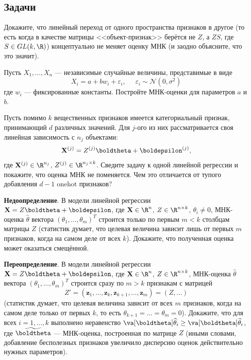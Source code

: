 \subsection*{Задачи}

\begin{problem}
    Докажите, что линейный переход от одного пространства признаков в другое (то есть когда в качестве матрицы <<объект-признак>> берётся не $Z$, а $ZS$, где $S \in GL(k, \R)$) концептуально не меняет оценку МНК (и заодно объясните, что это значит).
\end{problem}

\begin{problem}
	Пусть $X_1, \ldots, X_n$ --- независимые случайные величины, представимые в виде
\[
X_i = a + bw_i + \varepsilon_i, \;\;\;\;\; \varepsilon_i \sim \mathcal{N}(0, \sigma^2)
\]
где $w_i$ --- фиксированные константы. Постройте МНК-оценки для параметров $a$ и $b$.
\end{problem}

\begin{problem}
    Пусть помимо $k$ вещественных признаков имеется категориальный признак, принимающий $d$ различных значений. Для $j$-ого из них рассматривается своя линейная зависимость с $n_j$ объектами:
    \[
    \mathbf X^{(j)} = Z^{(j)} \boldtheta + \boldepsilon^{(j)},
    \]
    где $\mathbf X^{(j)} \in \R^{n_j}$, $Z^{(j)} \in \R^{n_j \times k}$. Сведите задачу к одной линейной регрессии и покажите, что оценка МНК не поменяется. Чем это отличается от тупого добавления $d-1$ onehot признаков?
\end{problem}

\begin{problem}
	{\bf Недоопределение}. В модели линейной регрессии $\mathbf{X} = Z\boldtheta + \boldepsilon$, где $\mathbf{X} \in \R^n$, $Z\in \R^{n \times k}$, $\theta_i \ne 0$, МНК-оценка $\widehat{\theta}$ вектора $(\theta_1, \ldots, \theta_m)^T$ строится только по первым $m < k$ столбцам матрицы $Z$ (статистик думает, что целевая величина зависит лишь от первых $m$ признаков, когда на самом деле от всех $k$). Докажите, что полученная оценка может оказаться смещённой.
\end{problem}

\begin{problem}
	{\bf Переопределение}. В модели линейной регрессии $\mathbf{X} = Z\boldtheta + \boldepsilon$, где $\mathbf{X} \in \R^n$, $Z\in \R^{n \times k}$, МНК-оценка $\widehat{\theta}$ вектора $(\theta_1, \ldots, \theta_m)^T$ строится сразу по $m > k$ признакам с матрицей
$$
Z' = (\mathbf{z}_{1}, \ldots, \mathbf{z}_{k}, \mathbf{z}_{k+1}, \ldots, \mathbf{z}_{m}) = (Z, \ldots)
$$
(статистик думает, что целевая величина зависит от всех $m$ признаков, когда на самом деле только от первых $k$, то есть $\theta_{k+1} = \ldots = \theta_m = 0$). Докажите, что для всех $i = 1, \ldots, k$ выполнено неравенство $\va[\boldtheta] \widehat\theta_i \ge \va[\boldtheta] \widetilde\theta_i$, где $\widetilde\boldtheta$ --- МНК-оценка, построенная по матрице $Z$ (иными словами, добавление бесполезных признаков увеличило дисперсию оценок действительно нужных параметров).
\end{problem}


